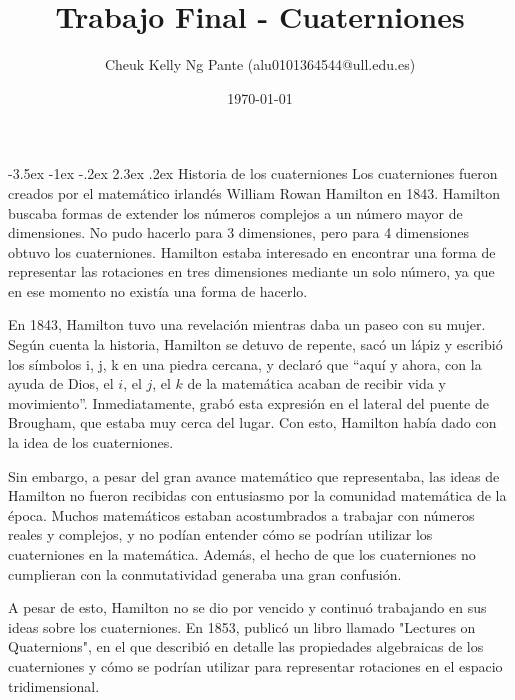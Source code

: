 \documentclass[11pt]{report}
\makeatletter
\newcommand{\subtitle}[1]{
  \posttitle{
    \par\end{center}
    \begin{center}\large#1\end{center}
    \vskip0.5em}
}
\renewcommand\chapter{\@startsection{chapter}{0}{\z@}%
    {-3.5ex \@plus -1ex \@minus -.2ex}%
    {2.3ex \@plus.2ex}%
    {\normalfont\Large\bfseries}}
\makeatother
\begin{document}
\title{Trabajo Final - Cuaterniones}
\subtitle{Robotica Computacional}
\author{Cheuk Kelly Ng Pante (alu0101364544@ull.edu.es)}
\date{\today}

\maketitle

\pagestyle{empty} %

\tableofcontents

\cleardoublepage

\pagestyle{plain} %
\setcounter{page}{1} %

\chapter{Historia de los cuaterniones}
Los cuaterniones fueron creados por el matemático irlandés William Rowan Hamilton en 1843. Hamilton buscaba
formas de extender los números complejos a un número mayor de dimensiones. No pudo hacerlo para 3 dimensiones,
pero para 4 dimensiones obtuvo los cuaterniones. Hamilton estaba interesado en encontrar una forma de representar
las rotaciones en tres dimensiones mediante un solo número, ya que en ese momento no existía una forma de hacerlo.

En 1843, Hamilton tuvo una revelación mientras daba un paseo con su mujer. Según
cuenta la historia, Hamilton se detuvo de repente, sacó un lápiz y escribió los
símbolos i, j, k en una piedra cercana, y declaró que “aquí y ahora, con la ayuda de
Dios, el $i$, el $j$, el $k$ de la matemática acaban de recibir vida y movimiento”.
Inmediatamente, grabó esta expresión en el lateral del puente de Brougham, que estaba
muy cerca del lugar. Con esto, Hamilton había dado con la idea de los cuaterniones.

Sin embargo, a pesar del gran avance matemático que representaba, las ideas de
Hamilton no fueron recibidas con entusiasmo por la comunidad matemática de la
época. Muchos matemáticos estaban acostumbrados a trabajar con números reales
y complejos, y no podían entender cómo se podrían utilizar los cuaterniones en la
matemática. Además, el hecho de que los cuaterniones no cumplieran con la
conmutatividad generaba una gran confusión.

A pesar de esto, Hamilton no se dio por vencido y continuó trabajando en sus ideas
sobre los cuaterniones. En 1853, publicó un libro llamado "Lectures on
Quaternions", en el que describió en detalle las propiedades algebraicas de los
cuaterniones y cómo se podrían utilizar para representar rotaciones en el espacio
tridimensional.
\end{document}
